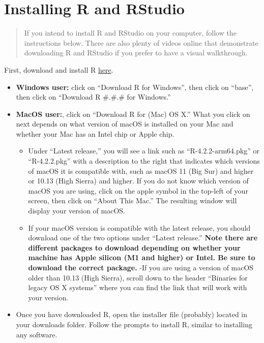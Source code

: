 \documentclass[
]{book}
\providecommand{\tightlist}{%
  \setlength{\itemsep}{0pt}\setlength{\parskip}{0pt}}
\begin{document}
\hypertarget{installing-r-and-rstudio}{%
\section{Installing R and RStudio}\label{installing-r-and-rstudio}}

\begin{quote}
If you intend to install R and RStudio on your computer, follow the instructions below. There are also plenty of videos online that demonstrate downloading R and RStudio if you prefer to have a visual walkthrough.
\end{quote}

First, download and install R \href{https://cloud.r-project.org/}{here}.

\begin{itemize}
\tightlist
\item
  \textbf{Windows user:} click on ``Download R for Windows'', then click on ``base'', then click on ``Download R \#.\#.\# for Windows.''
\item
  \textbf{MacOS user:}, click on ``Download R for (Mac) OS X.'' What you click on next depends on what version of macOS is installed on your Mac and whether your Mac has an Intel chip or Apple chip.

  \begin{itemize}
  \tightlist
  \item
    Under ``Latest release,'' you will see a link such as ``R-4.2.2-arm64.pkg'' or ``R-4.2.2.pkg'' with a description to the right that indicates which versions of macOS it is compatible with, such as macOS 11 (Big Sur) and higher or 10.13 (High Sierra) and higher. If you do not know which version of macOS you are using, click on the apple symbol in the top-left of your screen, then click on ``About This Mac.'' The resulting window will display your version of macOS.
  \item
    If your macOS version is compatible with the latest release, you should download one of the two options under ``Latest release.'' \textbf{Note there are different packages to download depending on whether your machine has Apple silicon (M1 and higher) or Intel. Be sure to download the correct package.}
    -If you are using a version of macOS older than 10.13 (High Sierra), scroll down to the header ``Binaries for legacy OS X systems'' where you can find the link that will work with your version.
  \end{itemize}
\item
  Once you have downloaded R, open the installer file (probably) located in your downloads folder. Follow the prompts to install R, similar to installing any software.
\end{itemize}
\end{document}
